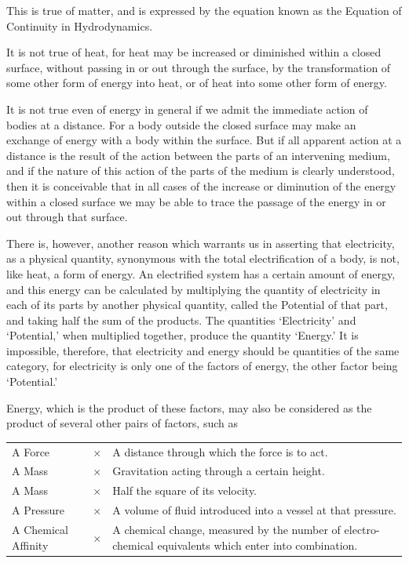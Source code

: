 \documentclass[11pt,a4paper]{article}
\begin{document}
This is true of matter, and is expressed by the equation known as the
Equation of Continuity in Hydrodynamics.

It is not true of heat, for heat may be increased or diminished within a
closed surface, without passing in or out through the surface, by the
transformation of some other form of energy into heat, or of heat into
some other form of energy.

It is not true even of energy in general if we admit the immediate
action of bodies at a distance. For a body outside the closed surface
may make an exchange of energy with a body within the surface. But if
all apparent action at a distance is the result of the action between
the parts of an intervening medium, and if the nature of this action of
the parts of the medium is clearly understood, then it is conceivable
that in all cases of the increase or diminution of the energy within a
closed surface we may be able to trace the passage of the energy in or
out through that surface.

There is, however, another reason which warrants us in asserting that
electricity, as a physical quantity, synonymous with the total
electrification of a body, is not, like heat, a form of energy. An
electrified system has a certain amount of energy, and this energy can
be calculated by multiplying the quantity of electricity in each of its
parts by another physical quantity, called the Potential of that part,
and taking half the sum of the products. The quantities `Electricity'
and `Potential,' when multiplied together, produce the quantity
`Energy.' It is impossible, therefore, that electricity and energy
should be quantities of the same category, for electricity is only one
of the factors of energy, the other factor being `Potential.'

\clearpage
\setcounter{footnote}{0}

Energy, which is the product of these factors, may also be considered
as the product of several other pairs of factors, such as

\begin{center}
\begin{tabular}{@{}l c p{}@{}}
A Force & \(\times\) & A distance through which the force is to act.\\
A Mass & \(\times\) & Gravitation acting through a certain height.\\
A Mass & \(\times\) & Half the square of its velocity.\\
A Pressure & \(\times\) & A volume of fluid introduced into a vessel at that pressure.\\
A Chemical Affinity & \(\times\) & A chemical change, measured by the number of electro-chemical equivalents which enter into combination.
\end{tabular}
\end{center}
\end{document}
